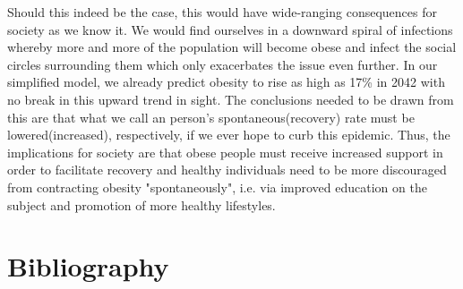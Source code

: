 \documentclass[11pt]{article}
\begin{document}
Should this indeed be the case, this would have wide-ranging consequences for society as we know it. We would find ourselves in a downward spiral of infections whereby more and more of the population will become obese and infect the social circles surrounding them which only exacerbates the issue even further. In our simplified model, we already predict obesity to rise as high as 17\% in 2042 with no break in this upward trend in sight. The conclusions needed to be drawn from this are that what we call an person's spontaneous(recovery) rate must be lowered(increased), respectively, if we ever hope to curb this epidemic. Thus, the implications for society are that obese people must receive increased support in order to facilitate recovery and healthy individuals need to be more discouraged from contracting obesity "spontaneously", i.e. via improved education on the subject and promotion of more healthy lifestyles. 

\newpage

\section{Bibliography}






\end{document}
